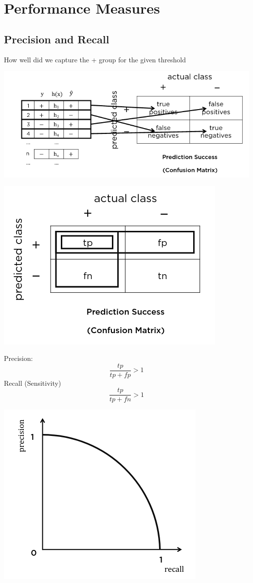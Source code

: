 \documentclass{article}[18pt]
\begin{document}
\section{Performance Measures}
\subsection{Precision and Recall}
How well did we capture the + group for the given threshold
\begin{center}
	\includegraphics[scale=0.7]{"Precision and Recall"}
\end{center}
\begin{center}
	\includegraphics[scale=0.7]{"Precision and Recall1"}
\end{center}
Precision:
$$\dfrac{tp}{tp+fp}>1$$
Recall (Sensitivity)
$$\dfrac{tp}{tp+fn}>1$$
\begin{center}
	\includegraphics[scale=0.7]{"Precision and Recall2"}
\end{center}
\end{document}
